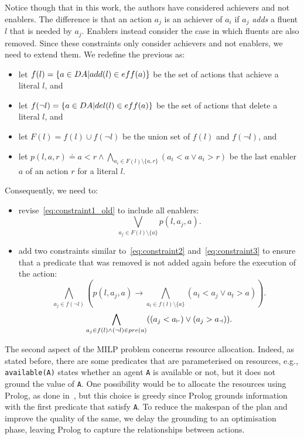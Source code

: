 Notice though that in this work, the authors have considered achievers and not enablers. The difference is that an action $a_j$ is an achiever of $a_i$ if $a_j$ \emph{adds} a fluent $l$ that is needed by $a_j$. Enablers instead consider the case in which fluents are also removed. 
%
Since these constraints only consider achievers and not enablers, we need to extend them. We redefine the previous as:
\begin{itemize}
    \item let $f(l)=\{a\in DA \vert add(l)\in eff(a)\}$ be the set of actions that achieve a literal $l$, and 
    \item let $f(\lnot l)=\{a\in DA \vert del(l) \in eff(a)\}$ be the set of actions that delete a literal $l$, and
    \item let $F(l) = f(l)\cup f(\lnot l)$ be the union set of $f(l)$ and $f(\lnot l)$, and
    \item let $\displaystyle p(l,a,r)\doteq a<r \wedge \bigwedge_{a_i\in F(l) \setminus\{a,r\}}(a_i<a\vee a_i>r)$ be the last enabler $a$ of an action $r$ for a literal $l$. 
\end{itemize}
Consequently, we need to:
\begin{itemize}
    \item revise~\autoref{eq:constraint1_old} to include all enablers:
        \begin{equation}
            \label{eq:constraint1}
            \bigvee_{a_j\in F(l)\setminus\{a\}} p(l,a_j,a).
        \end{equation}
    \item add two constraints similar to~\autoref{eq:constraint2} and~\autoref{eq:constraint3} to ensure that a predicate that was removed is not added again before the execution of the action:
    \begin{equation}
        \label{eq:constraint2_1}
        \bigwedge_{a_j\in f(\lnot l)} \left(p(l,a_j,a) \rightarrow \bigwedge_{a_t\in f(l)\setminus\{a\}}(a_t<a_j \vee a_t>a)\right).
    \end{equation}
    \begin{equation}
        \label{eq:constraint3_1}
        \bigwedge_{a_j\in f(l)\wedge (\lnot l)\in \pc{a}} ((a_j<\aStart{a}) \vee (a_j>\aEnd{a})).
    \end{equation}    
\end{itemize}

The second aspect of the MILP problem concerns resource allocation. Indeed, as stated before, there are some predicates that are parameterised on resources, e.g., \texttt{available(A)} states whether an agent \texttt{A} is available or not, but it does not ground the value of \texttt{A}. %
One possibility would be to allocate the resources using Prolog, as done in~\cite{saccon2023prolog}, but this choice is greedy since Prolog grounds information with the first predicate that satisfy \texttt{A}. To reduce the makespan of the plan and improve the quality of the same, we delay the grounding to an optimisation phase, leaving Prolog to capture the relationships between actions.

